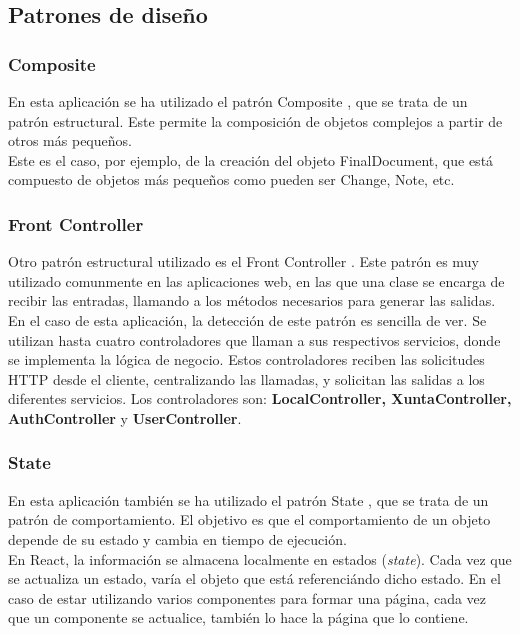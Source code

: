 \subsection{Patrones de diseño}

\subsubsection{Composite}

En esta aplicación se ha utilizado el patrón Composite \cite{composite}, que se trata de un patrón estructural. Este permite la composición de objetos complejos a partir de otros más pequeños. 
\\

Este es el caso, por ejemplo, de la creación del objeto FinalDocument, que está compuesto de objetos más pequeños como pueden ser Change, Note, etc.


\subsubsection{Front Controller}

Otro patrón estructural utilizado es el Front Controller \cite{frontcontroller}. Este patrón es muy utilizado comunmente en las aplicaciones web, en las que una clase se encarga de recibir las entradas, llamando a los métodos necesarios para generar las salidas.
\\

En el caso de esta aplicación, la detección de este patrón es sencilla de ver. Se utilizan hasta cuatro controladores que llaman a sus respectivos servicios, donde se implementa la lógica de negocio. Estos controladores reciben las solicitudes HTTP desde el cliente, centralizando las llamadas, y solicitan las salidas a los diferentes servicios. Los controladores son: {\bf LocalController, XuntaController, AuthController} y {\bf UserController}.


\subsubsection{State}

En esta aplicación también se ha utilizado el patrón State \cite{state}, que se trata de un patrón de comportamiento. El objetivo es que el comportamiento de un objeto depende de su estado y cambia en tiempo de ejecución. 
\\

En React, la información se almacena localmente en estados ({\it state}). Cada vez que se actualiza un estado, varía el objeto que está referenciándo dicho estado. En el caso de estar utilizando varios componentes para formar una página, cada vez que un componente se actualice, también lo hace la página que lo contiene.


